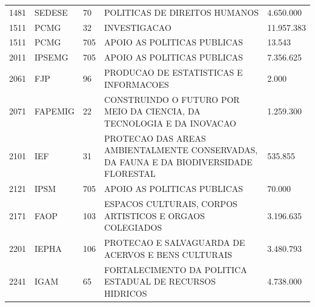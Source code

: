 \documentclass{article}
\begin{document}
\begin{longtable}[c]{m{1cm}|m{1.5cm}|m{1cm}m{10cm}|m{2cm}}
\multicolumn{1}{C{1cm}|}{1481} & \multicolumn{1}{L{1.5cm}|}{SEDESE} & \multicolumn{1}{C{1cm}|}{70} & \multicolumn{1}{L{10cm}|}{POLITICAS DE DIREITOS HUMANOS} & \multicolumn{1}{R{2cm}}{4.650.000} \\
\multicolumn{1}{C{1cm}|}{1511} & \multicolumn{1}{L{1.5cm}|}{PCMG} & \multicolumn{1}{C{1cm}|}{32} & \multicolumn{1}{L{10cm}|}{INVESTIGACAO} & \multicolumn{1}{R{2cm}}{11.957.383} \\
\multicolumn{1}{C{1cm}|}{1511} & \multicolumn{1}{L{1.5cm}|}{PCMG} & \multicolumn{1}{C{1cm}|}{705} & \multicolumn{1}{L{10cm}|}{APOIO AS POLITICAS PUBLICAS} & \multicolumn{1}{R{2cm}}{13.543} \\
\multicolumn{1}{C{1cm}|}{2011} & \multicolumn{1}{L{1.5cm}|}{IPSEMG} & \multicolumn{1}{C{1cm}|}{705} & \multicolumn{1}{L{10cm}|}{APOIO AS POLITICAS PUBLICAS} & \multicolumn{1}{R{2cm}}{7.356.625} \\
\multicolumn{1}{C{1cm}|}{2061} & \multicolumn{1}{L{1.5cm}|}{FJP} & \multicolumn{1}{C{1cm}|}{96} & \multicolumn{1}{L{10cm}|}{PRODUCAO DE ESTATISTICAS E INFORMACOES} & \multicolumn{1}{R{2cm}}{2.000} \\
\multicolumn{1}{C{1cm}|}{2071} & \multicolumn{1}{L{1.5cm}|}{FAPEMIG} & \multicolumn{1}{C{1cm}|}{22} & \multicolumn{1}{L{10cm}|}{CONSTRUINDO O FUTURO POR MEIO DA CIENCIA, DA TECNOLOGIA E DA INOVACAO} & \multicolumn{1}{R{2cm}}{1.259.300} \\
\multicolumn{1}{C{1cm}|}{2101} & \multicolumn{1}{L{1.5cm}|}{IEF} & \multicolumn{1}{C{1cm}|}{31} & \multicolumn{1}{L{10cm}|}{PROTECAO DAS AREAS AMBIENTALMENTE CONSERVADAS, DA FAUNA E DA BIODIVERSIDADE FLORESTAL} & \multicolumn{1}{R{2cm}}{535.855} \\
\multicolumn{1}{C{1cm}|}{2121} & \multicolumn{1}{L{1.5cm}|}{IPSM} & \multicolumn{1}{C{1cm}|}{705} & \multicolumn{1}{L{10cm}|}{APOIO AS POLITICAS PUBLICAS} & \multicolumn{1}{R{2cm}}{70.000} \\
\multicolumn{1}{C{1cm}|}{2171} & \multicolumn{1}{L{1.5cm}|}{FAOP} & \multicolumn{1}{C{1cm}|}{103} & \multicolumn{1}{L{10cm}|}{ESPACOS CULTURAIS, CORPOS ARTISTICOS E ORGAOS COLEGIADOS} & \multicolumn{1}{R{2cm}}{3.196.635} \\
\multicolumn{1}{C{1cm}|}{2201} & \multicolumn{1}{L{1.5cm}|}{IEPHA} & \multicolumn{1}{C{1cm}|}{106} & \multicolumn{1}{L{10cm}|}{PROTECAO E SALVAGUARDA DE ACERVOS E BENS CULTURAIS} & \multicolumn{1}{R{2cm}}{3.480.793} \\
\multicolumn{1}{C{1cm}|}{2241} & \multicolumn{1}{L{1.5cm}|}{IGAM} & \multicolumn{1}{C{1cm}|}{65} & \multicolumn{1}{L{10cm}|}{FORTALECIMENTO DA POLITICA ESTADUAL DE RECURSOS HIDRICOS} & \multicolumn{1}{R{2cm}}{4.738.000} \\

\end{longtable}
\end{document}
